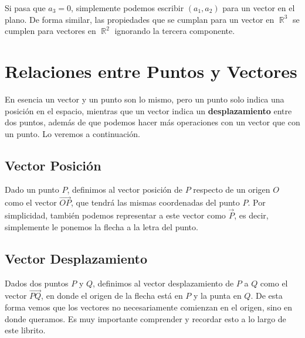 \documentclass[12pt, fleqn]{report}                             %
\theoremstyle{break}                                            %
\DeclareMathOperator \Reals        {\mathbb{R}}                 %
\newcommand{\lVec}[1]{\overrightarrow{#1}}                      %
\begin{document}
                Si pasa que $a_3 = 0$, simplemente podemos escribir $(a_1, a_2)$ para un vector en el plano.
                De forma similar, las propiedades que se cumplan para un vector en $\Reals^3$ se
                cumplen para vectores en $\Reals^2$ ignorando la tercera componente.

            
        \clearpage
        \section{Relaciones entre Puntos y Vectores}
        
            En esencia un vector y un punto son lo mismo, pero un punto solo indica una posición
            en el espacio, mientras que un vector indica un \textbf{desplazamiento} entre dos puntos, además
            de que podemos hacer más operaciones con un vector que con un punto.
            Lo veremos a continuación.
            
            \subsection{Vector Posición}
            
                Dado un punto $P$, definimos al vector posición de $P$ respecto de un origen $O$ como
                el vector $\lVec{OP}$, que tendrá las mismas coordenadas del punto $P$. Por simplicidad, también
                podemos representar a este vector como $\vec{P}$, es decir, simplemente le ponemos la flecha a
                la letra del punto.
            
            \subsection{Vector Desplazamiento}
            
                Dados dos puntos $P$ y $Q$, definimos al vector desplazamiento de $P$ a $Q$ como el
                vector $\lVec{PQ}$, en donde el origen de la flecha está en $P$ y la punta en $Q$.
                De esta forma vemos que los vectores no necesariamente comienzan en el origen,
                sino en donde queramos. Es muy importante comprender y recordar esto a lo largo
                de este librito.
\end{document}
